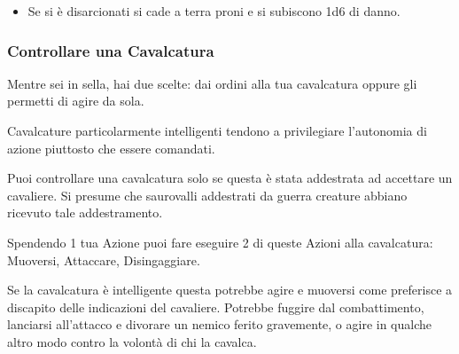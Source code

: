 \begin{multicols}{2}
\begin{itemize}[leftmargin=*]
\item
Se si è disarcionati si cade a terra proni e si subiscono 1d6 di danno.
\end{itemize}

\subsubsection{Controllare una Cavalcatura}\label{controllocavalcatura}

Mentre sei in sella, hai due scelte: dai ordini alla tua cavalcatura oppure gli permetti di agire da sola.

Cavalcature particolarmente intelligenti tendono a privilegiare l'autonomia di azione piuttosto che essere comandati.

Puoi controllare una cavalcatura solo se questa è stata addestrata ad accettare un cavaliere. Si presume che saurovalli addestrati da guerra creature abbiano ricevuto tale addestramento.

Spendendo 1 tua Azione puoi fare eseguire 2 di queste Azioni alla cavalcatura: Muoversi, Attaccare, Disingaggiare.

Se la cavalcatura è intelligente questa potrebbe agire e muoversi come preferisce a discapito delle indicazioni del cavaliere. Potrebbe fuggire dal combattimento, lanciarsi all'attacco e divorare un nemico ferito gravemente, o agire in qualche altro modo contro la volontà di chi la cavalca.

\end{multicols}

\vfill

